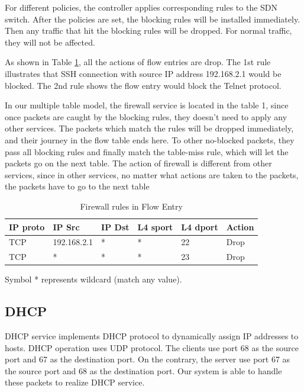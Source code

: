 \documentclass[journal]{IEEEtran}
\begin{document}
For different policies, the controller applies corresponding rules to the SDN switch. After the policies are set, the blocking rules will be installed immediately. Then any traffic that hit the blocking rules will be dropped. For normal traffic, they will not be affected.

As shown in Table \ref{table:fw}, all the actions of flow entries are drop. The 1st rule illustrates that SSH connection with source IP address 192.168.2.1 would be blocked. The 2nd rule shows the flow entry would block the Telnet protocol.

In our multiple table model, the firewall service is located in the table 1, since once packets are caught by the blocking rules, they doesn't need to apply any other services. The packets which match the rules will be dropped immediately, and their journey in the flow table ends here. To other no-blocked packets, they pass all blocking rules and finally match the table-miss rule, which will let the packets go on the next table. The action of firewall is different from other services, since in other services, no matter what actions are taken to the packets, the packets have to go to the next table

\begin{table}[]
\centering
\begin{threeparttable}
\label{table:fw}
\begin{tabular}{|l|l|l|l|l|l|}
\hline
IP proto & IP Src      & IP Dst       & L4 sport & L4 dport & Action \\ \hline
TCP      & 192.168.2.1 & *            & *        & 22       & Drop   \\ \hline
TCP      & *           & *            & *        & 23       & Drop   \\ \hline

\end{tabular}
\begin{tablenotes}
  \small
  \item Symbol * represents wildcard (match any value).
\end{tablenotes}
\end{threeparttable}
\caption{Firewall rules in Flow Entry}
\end{table}

\subsection{DHCP}
DHCP service implements DHCP protocol to dynamically assign IP addresses to hosts.
DHCP operation uses UDP protocol. The clients use port 68 as the source port and 67 as the destination port.
On the contrary, the server use port 67 as the source port and 68 as the destination port.
Our system is able to handle these packets  to realize DHCP service.
\end{document}
